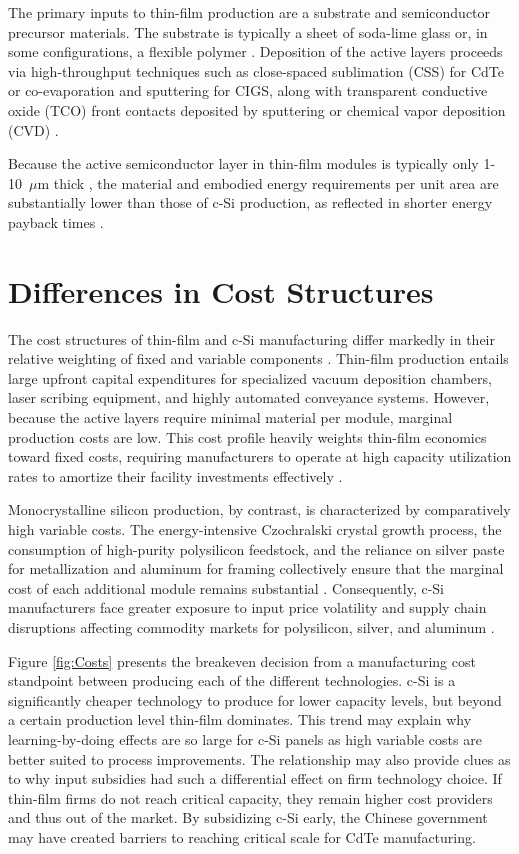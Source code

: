 \documentclass{article}
\begin{document}
The primary inputs to thin-film production are a substrate and semiconductor precursor materials. The substrate is typically a sheet of soda-lime glass or, in some configurations, a flexible polymer \citep{Fthenakis2011}. Deposition of the active layers proceeds via high-throughput techniques such as close-spaced sublimation (CSS) for CdTe or co-evaporation and sputtering for CIGS, along with transparent conductive oxide (TCO) front contacts deposited by sputtering or chemical vapor deposition (CVD) \citep{Amin2017, Bonnet2002}.

Because the active semiconductor layer in thin-film modules is typically only 1-10~$\mu$m thick \citep{Amin2017}, the material and embodied energy requirements per unit area are substantially lower than those of c-Si production, as reflected in shorter energy payback times \citep{Fthenakis2011, Raugei2007}.
 
\section{Differences in Cost Structures}
 
The cost structures of thin-film and c-Si manufacturing differ markedly in their relative weighting of fixed and variable components \citep{Powell2012, Powell2013}. Thin-film production entails large upfront capital expenditures for specialized vacuum deposition chambers, laser scribing equipment, and highly automated conveyance systems. However, because the active layers require minimal material per module, marginal production costs are low. This cost profile heavily weights thin-film economics toward fixed costs, requiring manufacturers to operate at high capacity utilization rates to amortize their facility investments effectively \citep{Goodrich2013}.
 
Monocrystalline silicon production, by contrast, is characterized by comparatively high variable costs. The energy-intensive Czochralski crystal growth process, the consumption of high-purity polysilicon feedstock, and the reliance on silver paste for metallization and aluminum for framing collectively ensure that the marginal cost of each additional module remains substantial \citep{Powell2012, Woodhouse2019}. Consequently, c-Si manufacturers face greater exposure to input price volatility and supply chain disruptions affecting commodity markets for polysilicon, silver, and aluminum \citep{ITRPV2024}.

Figure \ref{fig:Costs} presents the breakeven decision from a manufacturing cost standpoint between producing each of the different technologies. c-Si is a significantly cheaper technology to produce for lower capacity levels, but beyond a certain production level thin-film dominates. This trend may explain why learning-by-doing effects are so large for c-Si panels as high variable costs are better suited to process improvements. The relationship may also provide clues as to why input subsidies had such a differential effect on firm technology choice. If thin-film firms do not reach critical capacity, they remain higher cost providers and thus out of the market. By subsidizing c-Si early, the Chinese government may have created barriers to reaching critical scale for CdTe manufacturing.
\end{document}
